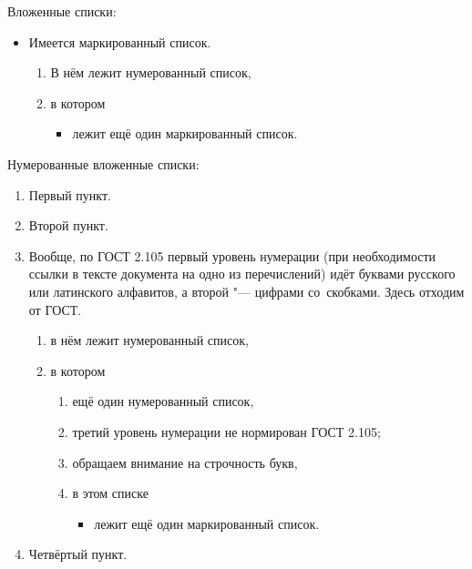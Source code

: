 \noindent Вложенные списки:
\begin{itemize}
    \item Имеется маркированный список.
          \begin{enumerate}
              \item В нём лежит нумерованный список,
              \item в котором
                    \begin{itemize}
                        \item лежит ещё один маркированный список.
                    \end{itemize}
          \end{enumerate}
\end{itemize}

\noindent Нумерованные вложенные списки:
\begin{enumerate}
    \item Первый пункт.
    \item Второй пункт.
    \item Вообще, по ГОСТ 2.105 первый уровень нумерации
          (при необходимости ссылки в тексте документа на одно из перечислений)
          идёт буквами русского или латинского алфавитов,
          а второй "--- цифрами со~скобками.
          Здесь отходим от ГОСТ.
          \begin{enumerate}
              \item в нём лежит нумерованный список,
              \item в котором
                    \begin{enumerate}
                        \item ещё один нумерованный список,
                        \item третий уровень нумерации не нормирован ГОСТ 2.105;
                        \item обращаем внимание на строчность букв,
                        \item в этом списке
                              \begin{itemize}
                                  \item лежит ещё один маркированный список.
                              \end{itemize}
                    \end{enumerate}

          \end{enumerate}

    \item Четвёртый пункт.
\end{enumerate}

